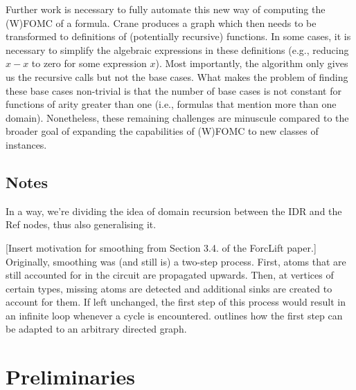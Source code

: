 
Further work is necessary to fully automate this new way of computing the
(W)FOMC of a formula. Crane produces a graph which then needs to be transformed
to definitions of (potentially recursive) functions. In some cases, it is
necessary to simplify the algebraic expressions in these definitions (e.g.,
reducing $x-x$ to zero for some expression $x$). Most importantly, the algorithm
only gives us the recursive calls but not the base cases. What makes the problem
of finding these base cases non-trivial is that the number of base cases is not
constant for functions of arity greater than one (i.e., formulas that mention
more than one domain). Nonetheless, these remaining challenges are minuscule
compared to the broader goal of expanding the capabilities of (W)FOMC to new
classes of instances.


\subsection{Notes}

In a way, we're dividing the idea of domain recursion between the IDR and the
Ref nodes, thus also generalising it.

[Insert motivation for smoothing from Section 3.4. of the ForcLift paper.]
Originally, smoothing was (and still is) a two-step process. First, atoms that
are still accounted for in the circuit are propagated upwards. Then, at vertices
of certain types, missing atoms are detected and additional sinks are created to
account for them. If left unchanged, the first step of this process would result
in an infinite loop whenever a cycle is encountered. 
outlines how the first step can be adapted to an arbitrary directed graph.

\section{Preliminaries}

